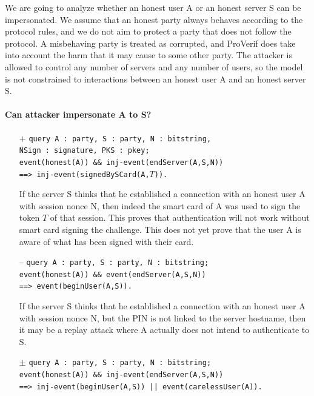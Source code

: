 We are going to analyze whether an honest user A or an honest server S can be impersonated. We assume that an honest party always behaves according to the protocol rules, and we do not aim to protect a party that does not follow the protocol. A misbehaving party is treated as corrupted, and ProVerif does take into account the harm that it may cause to some other party. The attacker is allowed to control any number of servers and any number of users, so the model is not constrained to interactions between an honest user A and an honest server S.

\paragraph{Can attacker impersonate A to S?}

\begin{itemize}
\item[+] \texttt{query A : party, S : party, N : bitstring,\\
                 NSign : signature, PKS : pkey;\\
                 event(honest(A)) \&\& inj-event(endServer(A,S,N))\\
                 ==> inj-event(signedBySCard(A,$T$)).}

If the server S thinks that he established a connection with an honest user A with session nonce N, then indeed the smart card of A was used to sign the token $T$ of that session. This proves that authentication will not work without smart card signing the challenge. This does not yet prove that the user A is aware of what has been signed with their card.

\item[--] \texttt{query A : party, S : party, N : bitstring;\\
                  event(honest(A)) \&\& event(endServer(A,S,N))\\
                  ==> event(beginUser(A,S)).}

If the server S thinks that he established a connection with an honest user A with session nonce N, but the PIN is not linked to the server hostname, then it may be a replay attack where A actually does not intend to authenticate to S.

\item[$\pm$] \texttt{query A : party, S : party, N : bitstring;\\
                 event(honest(A)) \&\& inj-event(endServer(A,S,N))\\
                 ==> inj-event(beginUser(A,S)) || event(carelessUser(A)).}


\end{itemize}
